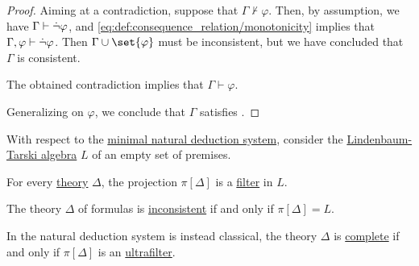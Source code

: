 \begin{proof}
  Aiming at a contradiction, suppose that \( \Gamma \not\vdash \varphi \). Then, by assumption, we have \( \Gamma \vdash \dot\neg \varphi \), and \eqref{eq:def:consequence_relation/monotonicity} implies that \( \Gamma, \varphi \vdash \dot\neg \varphi \). Then \( \Gamma \cup \set{ \varphi } \) must be inconsistent, but we have concluded that \( \Gamma \) is consistent.

  The obtained contradiction implies that \( \Gamma \vdash \varphi \).

  Generalizing on \( \varphi \), we conclude that \( \Gamma \) satisfies .
\end{proof}

\begin{proposition}\label{thm:lindenbaum_tarski_theories}
  With respect to the \hyperref[def:propositional_natural_deduction_systems]{minimal natural deduction system}, consider the \hyperref[def:lindenbaum_tarski_algebra]{Lindenbaum-Tarski algebra} \( L \) of an empty set of premises.

  \begin{thmenum}
     For every \hyperref[def:logical_theory]{theory} \( \Delta \), the projection \( \pi[\Delta] \) is a \hyperref[def:lattice_ideal]{filter} in \( L \).

     The theory \( \Delta \) of formulas is \hyperref[def:consistent_set_of_sentences]{inconsistent} if and only if \( \pi[\Delta] = L \).

     In the natural deduction system is instead classical, the theory \( \Delta \) is \hyperref[def:complete_set_of_sentences]{complete} if and only if \( \pi[\Delta] \) is an \hyperref[def:ultrafilter]{ultrafilter}.
  \end{thmenum}
\end{proposition}
